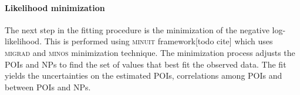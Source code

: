 
\paragraph{Likelihood minimization} The next step in the fitting procedure is the minimization of the negative log-likelihood. This is performed using \textsc{minuit} framework[todo cite] which uses \textsc{migrad} and \textsc{minos} minimization technique. The minimization process adjusts the POIs and NPs to find the set of values that best fit the observed data. The fit yields the uncertainties on the estimated POIs, correlations among POIs and between POIs and NPs.

